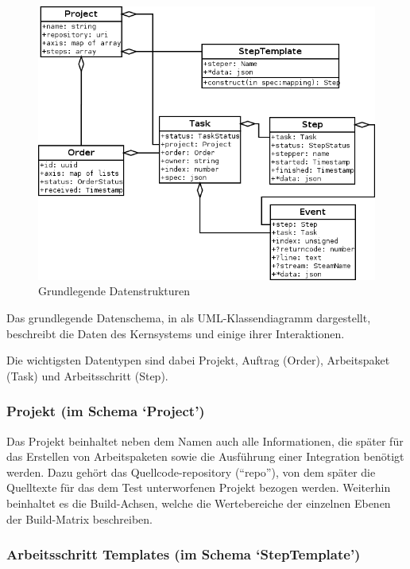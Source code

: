 \begin{figure}[ht] 
  \centering
  \includegraphics[width=\textwidth]{imageinput/datenstrukturen-step-templates.png}
  \caption{Grundlegende Datenstrukturen}
  \label{fig:datenstrukturen}
\end{figure}

Das grundlegende Datenschema, in  als \ac{UML}-Klassendiagramm dargestellt,
beschreibt die Daten des Kernsystems und einige ihrer Interaktionen.

Die wichtigsten Datentypen sind dabei Projekt, Auftrag (Order),
Arbeitspaket (Task) und Arbeitsschritt (Step).

\subsubsection{Projekt (im Schema `Project')}

Das Projekt beinhaltet neben dem Namen auch alle Informationen,
die später für das Erstellen von Arbeitspaketen sowie
die Ausführung einer Integration benötigt werden.
Dazu gehört das Quellcode-repository (``repo''), von dem später
die Quelltexte für das dem Test unterworfenen Projekt bezogen werden.
Weiterhin beinhaltet es die Build-Achsen,
welche die Wertebereiche der einzelnen Ebenen der Build-Matrix
beschreiben.

\subsubsection{Arbeitsschritt Templates (im Schema `StepTemplate')}

